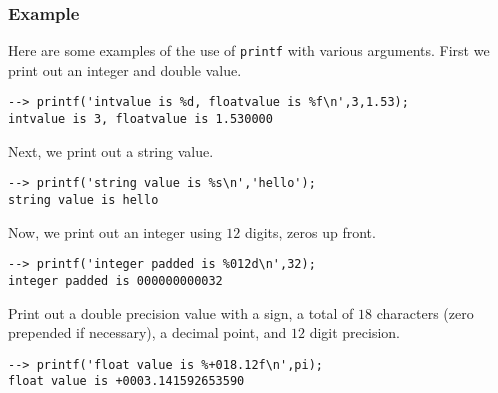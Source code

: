 \subsubsection{Example}
Here are some examples of the use of \verb|printf| with various arguments.  First we print out an integer and double value.
\begin{verbatim}
--> printf('intvalue is %d, floatvalue is %f\n',3,1.53);
intvalue is 3, floatvalue is 1.530000
\end{verbatim}
Next, we print out a string value.
\begin{verbatim}
--> printf('string value is %s\n','hello');
string value is hello
\end{verbatim}
Now, we print out an integer using $12$ digits, zeros up front.
\begin{verbatim}
--> printf('integer padded is %012d\n',32);
integer padded is 000000000032
\end{verbatim}
Print out a double precision value with a sign, a total of $18$ characters (zero prepended if necessary), a decimal point, and $12$ digit precision.
\begin{verbatim}
--> printf('float value is %+018.12f\n',pi);
float value is +0003.141592653590
\end{verbatim}
